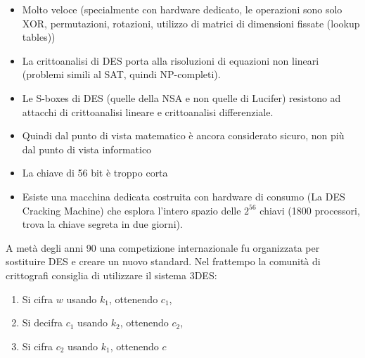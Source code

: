 \begin{itemize}
	\item Molto veloce (specialmente con hardware dedicato, le operazioni sono solo XOR, permutazioni, rotazioni, utilizzo di matrici di dimensioni fissate (lookup tables))
	\item La crittoanalisi di DES porta alla risoluzioni di equazioni non lineari (problemi simili al SAT, quindi NP-completi).
	\item Le S-boxes di DES (quelle della NSA e non quelle di Lucifer) resistono ad attacchi di crittoanalisi lineare e crittoanalisi differenziale.
	\item Quindi dal punto di vista matematico è ancora considerato sicuro, non più dal punto di vista informatico
	\item La chiave di 56 bit è troppo corta
	\item Esiste una macchina dedicata costruita con hardware di consumo (La DES Cracking Machine) che esplora l'intero spazio delle $2^{56}$ chiavi (1800 processori, trova la chiave segreta in due giorni).
\end{itemize}
A metà degli anni 90 una competizione internazionale fu organizzata per sostituire DES e creare un nuovo standard. Nel frattempo la comunità di crittografi consiglia di utilizzare il sistema 3DES:
\begin{enumerate}
	\item Si cifra $w$ usando $k_1$, ottenendo $c_1$,
	\item Si decifra $c_1$ usando $k_2$, ottenendo $c_2$,
	\item Si cifra $c_2$ usando $k_1$, ottenendo $c$
\end{enumerate}



